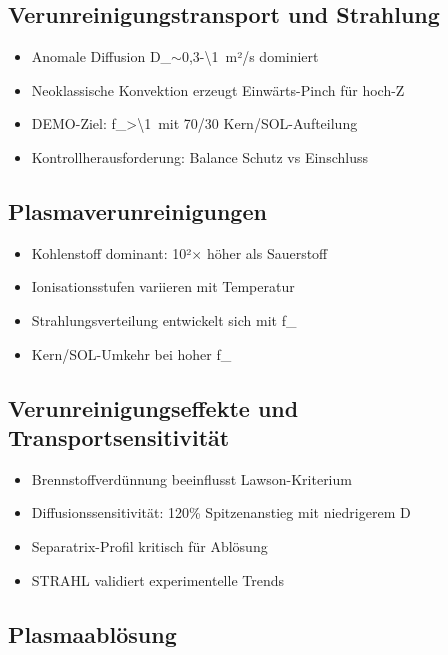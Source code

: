 \documentclass[11pt,a4paper]{article}
\begin{document}
\subsection{Verunreinigungstransport und Strahlung}

\begin{itemize}
\item Anomale Diffusion D_{}$\sim$0,3-\SI{\1}{m}²/s dominiert
\item Neoklassische Konvektion erzeugt Einwärts-Pinch für hoch-Z
\item DEMO-Ziel: f_{}>\SI{\1}{m}it 70/30 Kern/SOL-Aufteilung
\item Kontrollherausforderung: Balance Schutz vs Einschluss
\end{itemize}

\subsection{Plasmaverunreinigungen}

\begin{itemize}
\item Kohlenstoff dominant: 10²$\times$ höher als Sauerstoff
\item Ionisationsstufen variieren mit Temperatur
\item Strahlungsverteilung entwickelt sich mit f_{}
\item Kern/SOL-Umkehr bei hoher f_{}
\end{itemize}

\subsection{Verunreinigungseffekte und Transportsensitivität}

\begin{itemize}
\item Brennstoffverdünnung beeinflusst Lawson-Kriterium
\item Diffusionssensitivität: 120\% Spitzenanstieg mit niedrigerem D
\item Separatrix-Profil kritisch für Ablösung
\item STRAHL validiert experimentelle Trends
\end{itemize}

\subsection{Plasmaablösung}
\end{document}
